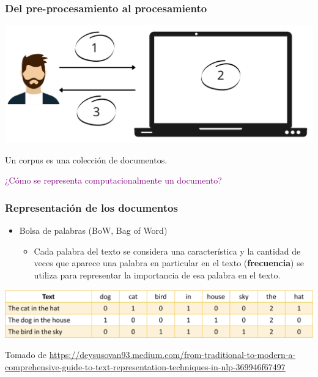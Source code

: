 \documentclass[
10pt, %
aspectratio=169, %
]{beamer}
\begin{document}
	\begin{frame}
		
		\frametitle{Del pre-procesamiento al procesamiento}
		
		
		\centering
		\includegraphics[scale=0.32]{motivacion.png} 
		
		\pause
		\begin{alertblock}{} 
			Un corpus es una colección de documentos.
		\end{alertblock}
		
		\vspace{2\baselineskip}
		\pause
		\textcolor{purple}{¿Cómo se representa computacionalmente un documento?}
		
	\end{frame}
	
	
	\begin{frame}
		
		\frametitle{Representación de los documentos}
		
		\begin{itemize}
			\item Bolsa de palabras (BoW, Bag of Word)
			
			\begin{itemize}
				\item Cada palabra del texto se considera una característica y la cantidad de veces que aparece una palabra en particular en el texto (\textbf{frecuencia}) se utiliza para representar la importancia de esa palabra en el texto.
			\end{itemize}
			
		\end{itemize}
		
		\pause
		\vspace{2\baselineskip}
		
		\centering
		\includegraphics[scale=0.3]{bow.png}
		
		{\scriptsize Tomado de \url{https://deysusovan93.medium.com/from-traditional-to-modern-a-comprehensive-guide-to-text-representation-techniques-in-nlp-369946f67497}}
		
	\end{frame}
	
\end{document}
